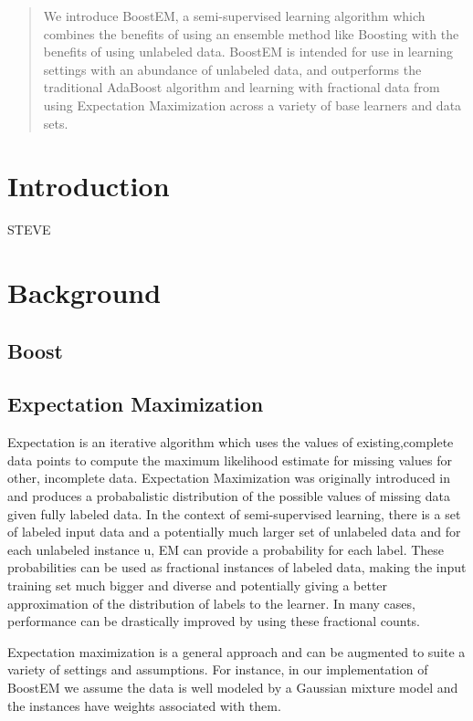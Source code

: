 \documentclass{sig-alternate}
\begin{document}
\maketitle
\begin{abstract}
We introduce BoostEM, a semi-supervised learning algorithm which combines the benefits of using an ensemble method like Boosting with the benefits of using unlabeled data.  BoostEM is intended for use in learning settings with an abundance of unlabeled data, and outperforms the traditional AdaBoost algorithm and learning with fractional data from using Expectation Maximization across a variety of base learners and data sets.
\end{abstract}

\section{Introduction}
STEVE
\section{Background}
\subsection{Boost}
\subsection{Expectation Maximization}
Expectation is an iterative algorithm which uses the values of existing,complete data points to compute the maximum likelihood estimate for missing values for other, incomplete data. Expectation Maximization was originally introduced in ~\cite{Dempster77maximumlikelihood} and produces a probabalistic distribution of the possible values of missing data given fully labeled data. In the context of semi-supervised learning, there is a set of labeled input data and a potentially much larger set of unlabeled data and for each unlabeled instance u, EM can provide a probability for each label.  These probabilities can be used as fractional instances of labeled data, making the input training set much bigger and diverse and potentially giving a better approximation of the distribution of labels to the learner. In many cases, performance can be drastically improved by using these fractional counts.

Expectation maximization is a general approach and can be augmented to suite a variety of settings and assumptions.  For instance, in our implementation of BoostEM we assume the data is well modeled by a Gaussian mixture model and the instances have weights associated with them.    
\end{document}
